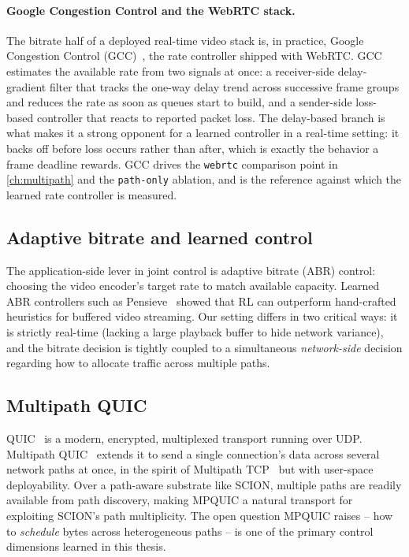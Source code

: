 \paragraph{Google Congestion Control and the WebRTC stack.} The bitrate half of a deployed real-time
video stack is, in practice, Google Congestion Control (GCC)~\cite{Carlucci2016}, the rate controller
shipped with WebRTC. GCC estimates the available rate from two signals at once: a receiver-side
delay-gradient filter that tracks the one-way delay trend across successive frame groups and reduces the
rate as soon as queues start to build, and a sender-side loss-based controller that reacts to reported
packet loss. The delay-based branch is what makes it a strong opponent for a learned controller in a
real-time setting: it backs off before loss occurs rather than after, which is exactly the behavior a
frame deadline rewards. GCC drives the \texttt{webrtc} comparison point in \cref{ch:multipath} and the
\texttt{path-only} ablation, and is the reference against which the learned rate controller is measured.

\subsection{Adaptive bitrate and learned control}
The application-side lever in joint control is adaptive bitrate (ABR) control: choosing the video encoder's
target rate to match available capacity. Learned ABR controllers such as Pensieve~\cite{Mao2017}
showed that RL can outperform hand-crafted heuristics for buffered video streaming. Our setting differs
in two critical ways: it is strictly real-time (lacking a large playback buffer to hide network variance), 
and the bitrate decision is tightly coupled to a simultaneous \emph{network-side} decision regarding how to 
allocate traffic across multiple paths.

\subsection{Multipath QUIC}
QUIC~\cite{RFC9000} is a modern, encrypted, multiplexed transport running over UDP. Multipath
QUIC~\cite{DeConinck2017} extends it to send a single connection's data across several network paths at
once, in the spirit of Multipath TCP~\cite{RFC8684} but with user-space deployability. Over a 
path-aware substrate like SCION, multiple paths are readily available from path discovery, making MPQUIC 
a natural transport for exploiting SCION's path multiplicity. The open question MPQUIC raises -- 
how to \emph{schedule} bytes across heterogeneous paths -- is one of the primary control dimensions learned 
in this thesis.

